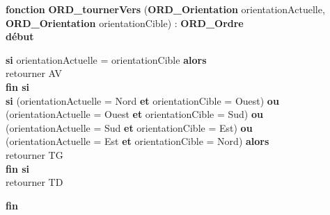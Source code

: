 \noindent\textbf{fonction} \textbf{ORD\_tournerVers} (\textbf{ORD\_Orientation} orientationActuelle, \textbf{ORD\_Orientation} orientationCible) : \textbf{ORD\_Ordre}\\
\textbf{début}
\begin{flushleft}
    \hspace*{1cm}\textbf{si} orientationActuelle = orientationCible \textbf{alors}\\
    \hspace*{2cm}retourner AV\\
    \hspace*{1cm}\textbf{fin si}\\
    \hspace*{1cm}\textbf{si} (orientationActuelle = Nord \textbf{et} orientationCible = Ouest) \textbf{ou}\\
    \hspace*{2cm}(orientationActuelle = Ouest \textbf{et} orientationCible = Sud) \textbf{ou}\\
    \hspace*{2cm}(orientationActuelle = Sud \textbf{et} orientationCible = Est) \textbf{ou}\\
    \hspace*{2cm}(orientationActuelle = Est \textbf{et} orientationCible = Nord) \textbf{alors}\\
    \hspace*{2cm}retourner TG\\
    \hspace*{1cm}\textbf{fin si}\\
    \hspace*{1cm}retourner TD
\end{flushleft}
\textbf{fin}\\

